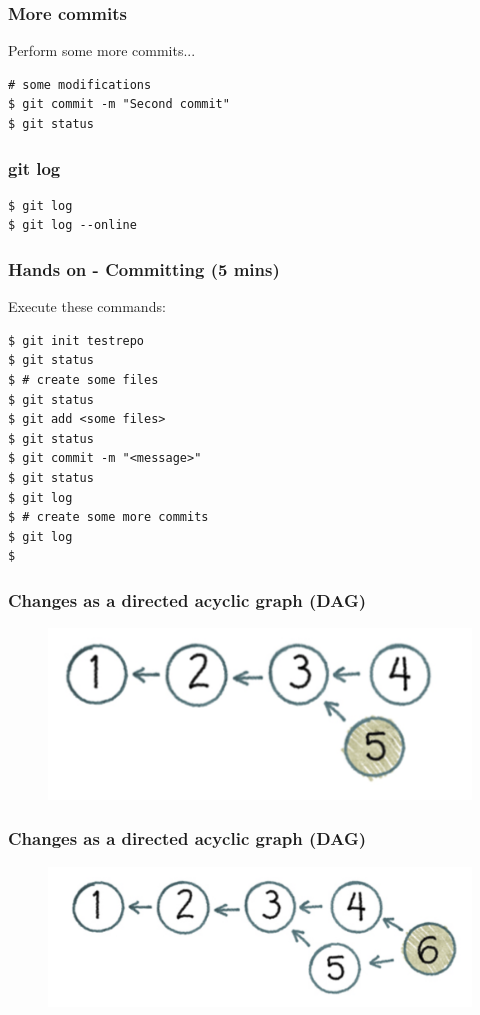 \documentclass{beamer}
\begin{document}
\begin{frame}[fragile]
\frametitle{More commits}

Perform some more commits...

\begin{lstlisting}
# some modifications
$ git commit -m "Second commit"
$ git status
\end{lstlisting}
\end{frame}


\begin{frame}[fragile]
\frametitle{git log}

\begin{lstlisting}
$ git log
$ git log --online
\end{lstlisting}
\end{frame}

\begin{frame}[fragile]
\frametitle{Hands on - Committing (5 mins)}

Execute these commands:

\begin{lstlisting}
$ git init testrepo
$ git status
$ # create some files
$ git status
$ git add <some files>
$ git status
$ git commit -m "<message>"
$ git status
$ git log
$ # create some more commits
$ git log
$
\end{lstlisting}
\end{frame}



\begin{frame}
\frametitle{Changes as a directed acyclic graph (DAG)}

\begin{figure}
\includegraphics[scale=0.3]{figures/f10.png}
\end{figure}

\end{frame}

\begin{frame}
\frametitle{Changes as a directed acyclic graph (DAG)}

\begin{figure}
\includegraphics[scale=0.3]{figures/f11.png}
\end{figure}

\end{frame}
\end{document}
